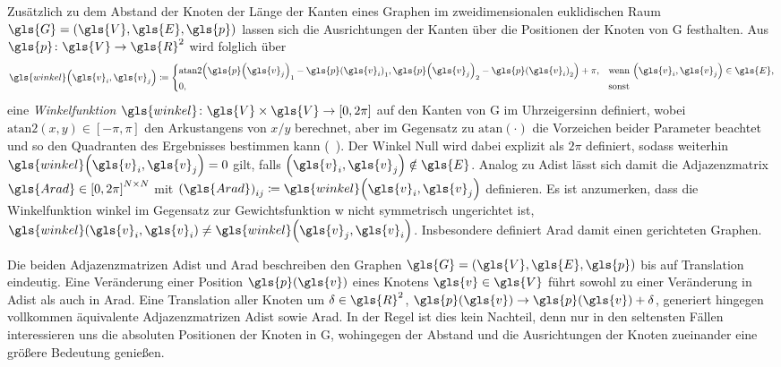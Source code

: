 Zusätzlich zu dem Abstand der Knoten \bzw{} der Länge der Kanten eines Graphen im zweidimensionalen euklidischen Raum $\gls{G} = \left(\gls{V}, \gls{E}, \gls{p}\right)$ lassen sich die Ausrichtungen der Kanten über die Positionen der Knoten von \gls{G} festhalten.
Aus $\gls{p} \colon \gls{V} \to \gls{R}^2$ wird folglich über
\begin{equation}
  \gls{winkel}\left(\gls{v}_i, \gls{v}_j\right) \coloneqq \begin{cases}
    \mathrm{atan2}\left({\gls{p}\left(\gls{v}_j\right)}_1 - {\gls{p}\left(\gls{v}_i\right)}_1, {\gls{p}\left(\gls{v}_j\right)}_2 - {\gls{p}\left(\gls{v}_i\right)}_2\right) + \pi, & \text{wenn }\left(\gls{v}_i, \gls{v}_j\right) \in \gls{E},\\
    0, & \text{sonst}
  \end{cases}
  \label{eq:winkelfunktion}
\end{equation}
eine \emph{Winkelfunktion} $\gls{winkel} \colon \gls{V} \times \gls{V} \to \left[0, 2\pi\right]$ auf den Kanten von \gls{G} im Uhrzeigersinn definiert, wobei $\mathrm{atan2}\left(x, y\right) \in \left[-\pi, \pi\right]$ den Arkustangens von $x/y$ berechnet, aber im Gegensatz zu $\mathrm{atan}\left(\cdot\right)$ die Vorzeichen beider Parameter beachtet und so den Quadranten des Ergebnisses bestimmen kann (\vgl{}~\cite{atan2}).
Der Winkel Null wird dabei explizit als $2\pi$ definiert, sodass weiterhin $\gls{winkel}\left(\gls{v}_i, \gls{v}_j\right) = 0$ gilt, falls $\left(\gls{v}_i, \gls{v}_j\right) \notin \gls{E}$.
Analog zu \gls{Adist} lässt sich damit die Adjazenzmatrix $\gls{Arad} \in {\left[0, 2\pi\right]}^{N \times N}$ mit ${\left(\gls{Arad}\right)}_{ij} \coloneqq \gls{winkel}\left(\gls{v}_i, \gls{v}_j\right)$ definieren.
Es ist anzumerken, dass die Winkelfunktion \gls{winkel} im Gegensatz zur Gewichtsfunktion \gls{w} nicht symmetrisch \bzw{} ungerichtet ist, \dhe{} $\gls{winkel}\left(\gls{v}_i, \gls{v}_i\right) \neq \gls{winkel}\left(\gls{v}_j, \gls{v}_i\right)$.
Insbesondere definiert \gls{Arad} damit einen gerichteten Graphen.

Die beiden Adjazenzmatrizen \gls{Adist} und \gls{Arad} beschreiben den Graphen $\gls{G} = \left(\gls{V}, \gls{E}, \gls{p}\right)$ bis auf Translation eindeutig.
Eine Veränderung einer Position $\gls{p}\left(\gls{v}\right)$ eines Knotens $\gls{v} \in \gls{V}$ führt sowohl zu einer Veränderung in \gls{Adist} als auch in \gls{Arad}.
Eine Translation aller Knoten um $\ve{\delta} \in \gls{R}^2$, \dhe{} $\gls{p}\left(\gls{v}\right) \rightarrow \gls{p}\left(\gls{v}\right) + \ve{\delta}$, generiert hingegen vollkommen äquivalente Adjazenzmatrizen \gls{Adist} sowie \gls{Arad}.
In der Regel ist dies kein Nachteil, denn nur in den seltensten Fällen interessieren uns die absoluten Positionen der Knoten in \gls{G}, wohingegen der Abstand und die Ausrichtungen der Knoten zueinander eine größere Bedeutung genießen.

